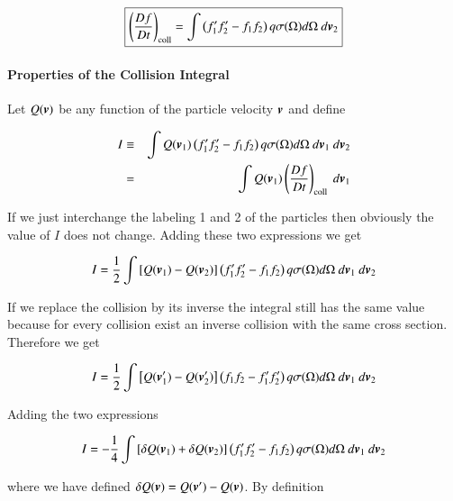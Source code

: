 \begin{equation}
\boxed{
\left(\frac{Df}{Dt}\right)_{\rm coll} = \int \left(f_1^\prime f_2^\prime-f_1f_2 \right)q \sigma(\Omega)d\Omega \ d{\boldsymbol{v}}_2
}
\end{equation}

\paragraph{Properties of the Collision Integral}

Let $Q({\boldsymbol{v}})$ be any function of the particle velocity ${\boldsymbol{v}}$ and define

\begin{eqnarray}
I &\equiv& \int Q(\v{v}_1) \left(f_1^\prime f_2^\prime-f_1f_2 \right)q \sigma(\Omega)d\Omega \ d\v{v}_1\ d\v{v}_2 \\
&=& \int Q(\v{v}_1)  \left(\frac{Df}{Dt}\right)_{\rm coll}\ d\v{v}_1
\end{eqnarray}


\noindent  If we just interchange the labeling 1 and 2 of the particles then obviously the value of $I$ does not change. Adding these two expressions we get
 
\begin{equation}
I = \frac{1}{2}\int \left[Q({\boldsymbol{v}}_1)-Q({\boldsymbol{v}}_2)\right] \left(f_1^\prime f_2^\prime-f_1f_2 \right)q \sigma(\Omega)d\Omega \ d{\boldsymbol{v}}_1\ d{\boldsymbol{v}}_2 
\end{equation}
 
 
\noindent  If we replace the collision by its inverse the integral still has the same value because for every collision exist an inverse collision with the same cross section. Therefore we get

\begin{equation}
I = \frac{1}{2}\int \left[Q(\v{v}_1^\prime)-Q(\v{v}_2^\prime)\right] \left(f_1f_2-f_1^\prime f_2^\prime \right)q \sigma(\Omega)d\Omega \ d\v{v}_1 \ d\v{v}_2 
\end{equation}

 
\noindent  Adding the two expressions

\begin{equation}
I = -\frac{1}{4}\int \left[\delta Q({\boldsymbol{v}}_1)+\delta Q({\boldsymbol{v}}_2)\right] \left(f_1^\prime f_2^\prime -f_1f_2 \right)q \sigma(\Omega)d\Omega \ d{\boldsymbol{v}}_1 \ d{\boldsymbol{v}}_2 
\end{equation}

\noindent  where we have defined $\delta Q({\boldsymbol{v}}) =
Q({\boldsymbol{v}}^\prime)-Q({\boldsymbol{v}})$. By definition

